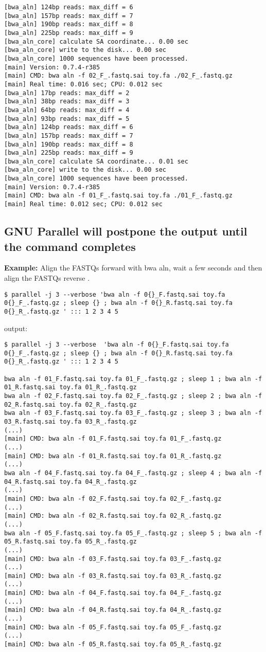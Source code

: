 \documentclass{article}
\newcommand{\example}[1]{
\textbf{Example: } {\color[rgb]{0,0,1} #1 } .
}
\begin{document}
\begin{lstlisting}
[bwa_aln] 124bp reads: max_diff = 6
[bwa_aln] 157bp reads: max_diff = 7
[bwa_aln] 190bp reads: max_diff = 8
[bwa_aln] 225bp reads: max_diff = 9
[bwa_aln_core] calculate SA coordinate... 0.00 sec
[bwa_aln_core] write to the disk... 0.00 sec
[bwa_aln_core] 1000 sequences have been processed.
[main] Version: 0.7.4-r385
[main] CMD: bwa aln -f 02_F_.fastq.sai toy.fa ./02_F_.fastq.gz
[main] Real time: 0.016 sec; CPU: 0.012 sec
[bwa_aln] 17bp reads: max_diff = 2
[bwa_aln] 38bp reads: max_diff = 3
[bwa_aln] 64bp reads: max_diff = 4
[bwa_aln] 93bp reads: max_diff = 5
[bwa_aln] 124bp reads: max_diff = 6
[bwa_aln] 157bp reads: max_diff = 7
[bwa_aln] 190bp reads: max_diff = 8
[bwa_aln] 225bp reads: max_diff = 9
[bwa_aln_core] calculate SA coordinate... 0.01 sec
[bwa_aln_core] write to the disk... 0.00 sec
[bwa_aln_core] 1000 sequences have been processed.
[main] Version: 0.7.4-r385
[main] CMD: bwa aln -f 01_F_.fastq.sai toy.fa ./01_F_.fastq.gz
[main] Real time: 0.012 sec; CPU: 0.012 sec
\end{lstlisting}

\subsection{GNU Parallel will postpone the output until the command completes}
\example{Align the FASTQs forward with bwa aln, wait a few seconds and then align the FASTQs reverse }
\begin{lstlisting}
$ parallel -j 3 --verbose 'bwa aln -f 0{}_F.fastq.sai toy.fa 0{}_F_.fastq.gz ; sleep {} ; bwa aln -f 0{}_R.fastq.sai toy.fa 0{}_R_.fastq.gz ' ::: 1 2 3 4 5
\end{lstlisting}
output:
\begin{lstlisting}
$ parallel -j 3 --verbose  'bwa aln -f 0{}_F.fastq.sai toy.fa 0{}_F_.fastq.gz ; sleep {} ; bwa aln -f 0{}_R.fastq.sai toy.fa 0{}_R_.fastq.gz ' ::: 1 2 3 4 5

bwa aln -f 01_F.fastq.sai toy.fa 01_F_.fastq.gz ; sleep 1 ; bwa aln -f 01_R.fastq.sai toy.fa 01_R_.fastq.gz 
bwa aln -f 02_F.fastq.sai toy.fa 02_F_.fastq.gz ; sleep 2 ; bwa aln -f 02_R.fastq.sai toy.fa 02_R_.fastq.gz 
bwa aln -f 03_F.fastq.sai toy.fa 03_F_.fastq.gz ; sleep 3 ; bwa aln -f 03_R.fastq.sai toy.fa 03_R_.fastq.gz 
(...)
[main] CMD: bwa aln -f 01_F.fastq.sai toy.fa 01_F_.fastq.gz
(...)
[main] CMD: bwa aln -f 01_R.fastq.sai toy.fa 01_R_.fastq.gz
(...)
bwa aln -f 04_F.fastq.sai toy.fa 04_F_.fastq.gz ; sleep 4 ; bwa aln -f 04_R.fastq.sai toy.fa 04_R_.fastq.gz 
(...)
[main] CMD: bwa aln -f 02_F.fastq.sai toy.fa 02_F_.fastq.gz
(...)
[main] CMD: bwa aln -f 02_R.fastq.sai toy.fa 02_R_.fastq.gz
(...)
bwa aln -f 05_F.fastq.sai toy.fa 05_F_.fastq.gz ; sleep 5 ; bwa aln -f 05_R.fastq.sai toy.fa 05_R_.fastq.gz 
(...)
[main] CMD: bwa aln -f 03_F.fastq.sai toy.fa 03_F_.fastq.gz
(...)
[main] CMD: bwa aln -f 03_R.fastq.sai toy.fa 03_R_.fastq.gz
(...)
[main] CMD: bwa aln -f 04_F.fastq.sai toy.fa 04_F_.fastq.gz
(...)
[main] CMD: bwa aln -f 04_R.fastq.sai toy.fa 04_R_.fastq.gz
(...)
[main] CMD: bwa aln -f 05_F.fastq.sai toy.fa 05_F_.fastq.gz
(...)
[main] CMD: bwa aln -f 05_R.fastq.sai toy.fa 05_R_.fastq.gz
\end{lstlisting}
\end{document}
